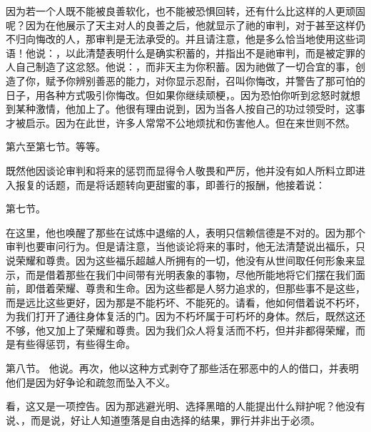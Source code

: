 因为若一个人既不能被良善软化，也不能被恐惧回转，还有什么比这样的人更顽固呢？因为在他展示了天主对人的良善之后，他就显示了祂的审判，对于甚至这样仍不归向悔改的人，那审判是无法承受的。并且请注意，他是多么恰当地使用这些词语！他说：，以此清楚表明什么是确实积蓄的，并指出不是祂审判，而是被定罪的人自己制造了这忿怒。他说：，而非天主为你积蓄。因为祂做了一切合宜的事，创造了你，赋予你辨别善恶的能力，对你显示忍耐，召叫你悔改，并警告了那可怕的日子，用各种方式吸引你悔改。但如果你继续顽梗，。因为恐怕你听到忿怒时就想到某种激情，他加上了。他很有理由说到，因为当各人按自己的功过领受时，这事才被启示。因为在此世，许多人常常不公地烦扰和伤害他人。但在来世则不然。\par

第六至第七节。等等。\par

既然他因谈论审判和将来的惩罚而显得令人敬畏和严厉，他并没有如人所料立即进入报复的话题，而是将话题转向更甜蜜的事，即善行的报酬，他接着说：\par

第七节。 \par

在这里，他也唤醒了那些在试炼中退缩的人，表明只信赖信德是不对的。因为那个审判也要审问行为。但是请注意，当他谈论将来的事时，他无法清楚说出福乐，只说荣耀和尊贵。因为这些福乐超越人所拥有的一切，他没有从世间取任何形象来显示，而是借着那些在我们中间带有光明表象的事物，尽他所能地将它们摆在我们面前，即借着荣耀、尊贵和生命。因为这些都是人努力追求的，但那些事不是这些，而是远比这些更好，因为那是不能朽坏、不能死的。请看，他如何借着说不朽坏，为我们打开了通往身体复活的门。因为不朽坏属于可朽坏的身体。然后，既然这还不够，他又加上了荣耀和尊贵。因为我们众人将复活而不朽，但并非都得荣耀，而是有些得惩罚，有些得生命。\par

第八节。 他说。再次，他以这种方式剥夺了那些活在邪恶中的人的借口，并表明他们是因为好争论和疏忽而坠入不义。\par

看，这又是一项控告。因为那逃避光明、选择黑暗的人能提出什么辩护呢？他没有说、，而是说，好让人知道堕落是自由选择的结果，罪行并非出于必须。\par

